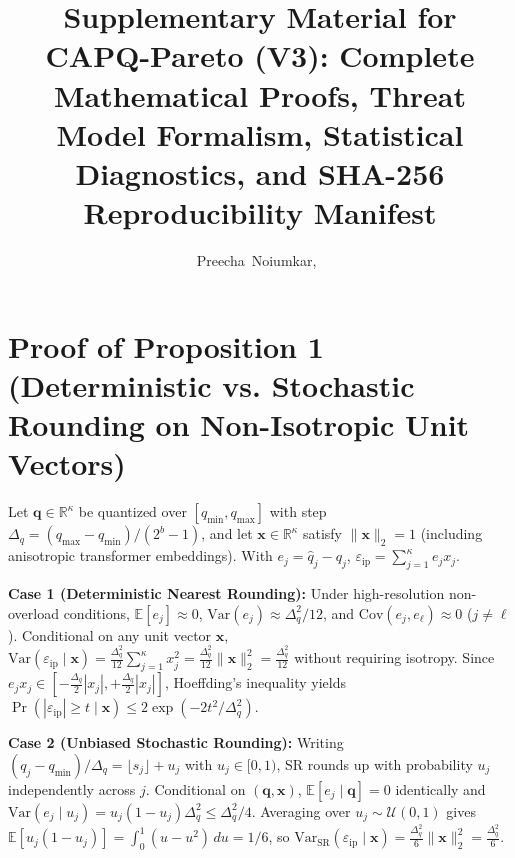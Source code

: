 \documentclass[10pt,journal,compsoc]{IEEEtran}
\begin{document}
\title{Supplementary Material for CAPQ-Pareto (V3): Complete Mathematical Proofs, Threat Model Formalism, Statistical Diagnostics, and SHA-256 Reproducibility Manifest}
\author{Preecha~Noiumkar,~%
}
\maketitle

\section{Proof of Proposition 1 (Deterministic vs. Stochastic Rounding on Non-Isotropic Unit Vectors)}
Let $\mathbf{q} \in \mathbb{R}^\kappa$ be quantized over $[q_{\min}, q_{\max}]$ with step $\Delta_q = (q_{\max}-q_{\min})/(2^b - 1)$, and let $\mathbf{x} \in \mathbb{R}^\kappa$ satisfy $\|\mathbf{x}\|_2 = 1$ (including anisotropic transformer embeddings). With $e_j = \hat{q}_j - q_j$, $\varepsilon_{\text{ip}} = \sum_{j=1}^\kappa e_j x_j$.

\textbf{Case 1 (Deterministic Nearest Rounding):} Under high-resolution non-overload conditions, $\mathbb{E}[e_j]\approx 0$, $\text{Var}(e_j)\approx \Delta_q^2/12$, and $\text{Cov}(e_j, e_\ell)\approx 0$ ($j \ne \ell$). Conditional on any unit vector $\mathbf{x}$, $\text{Var}(\varepsilon_{\text{ip}} \mid \mathbf{x}) = \frac{\Delta_q^2}{12}\sum_{j=1}^\kappa x_j^2 = \frac{\Delta_q^2}{12}\|\mathbf{x}\|_2^2 = \frac{\Delta_q^2}{12}$ without requiring isotropy. Since $e_j x_j \in [-\frac{\Delta_q}{2}|x_j|, +\frac{\Delta_q}{2}|x_j|]$, Hoeffding's inequality yields $\Pr(|\varepsilon_{\text{ip}}| \ge t \mid \mathbf{x}) \le 2\exp(-2t^2/\Delta_q^2)$.

\textbf{Case 2 (Unbiased Stochastic Rounding):} Writing $(q_j - q_{\min})/\Delta_q = \lfloor s_j \rfloor + u_j$ with $u_j \in [0,1)$, SR rounds up with probability $u_j$ independently across $j$. Conditional on $(\mathbf{q},\mathbf{x})$, $\mathbb{E}[e_j \mid \mathbf{q}] = 0$ identically and $\text{Var}(e_j \mid u_j) = u_j(1-u_j)\Delta_q^2 \le \Delta_q^2/4$. Averaging over $u_j \sim \mathcal{U}(0,1)$ gives $\mathbb{E}[u_j(1-u_j)] = \int_0^1 (u-u^2)\,du = 1/6$, so $\text{Var}_{\text{SR}}(\varepsilon_{\text{ip}} \mid \mathbf{x}) = \frac{\Delta_q^2}{6}\|\mathbf{x}\|_2^2 = \frac{\Delta_q^2}{6}$.
\end{document}

